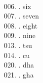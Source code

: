 \begin{tabbing}
\filler\tenrm\ \tibetan
\egroup  \\
006. .	\> six	\> \bgroup\tibetan \def\u#1{\vtop{\baselineskip0pt\hbox{#1}\hbox{\tibsp\char123}}}\parindent=0pt \newbox\fillerbox\setbox\fillerbox\hbox{\vrule height0.4cm depth0.4cm width0pt}\def\filler{\copy\fillerbox}\tibsp{}\tibetan%
\filler\tenrm\ \tibetan
\egroup  \\
007. .	\> seven	\> \bgroup\tibetan \def\u#1{\vtop{\baselineskip0pt\hbox{#1}\hbox{\tibsp\char123}}}\parindent=0pt \newbox\fillerbox\setbox\fillerbox\hbox{\vrule height0.4cm depth0.4cm width0pt}\def\filler{\copy\fillerbox}\tibsp{}\tibetan%
\filler\tenrm\ \tibetan
\egroup  \\
008. .	\> eight	\> \bgroup\tibetan \def\u#1{\vtop{\baselineskip0pt\hbox{#1}\hbox{\tibsp\char123}}}\parindent=0pt \newbox\fillerbox\setbox\fillerbox\hbox{\vrule height0.4cm depth0.4cm width0pt}\def\filler{\copy\fillerbox}\tibsp{}\tibetan%
\filler\tenrm\ \tibetan
\egroup  \\
009. .	\> nine	\> \bgroup\tibetan \def\u#1{\vtop{\baselineskip0pt\hbox{#1}\hbox{\tibsp\char123}}}\parindent=0pt \newbox\fillerbox\setbox\fillerbox\hbox{\vrule height0.4cm depth0.4cm width0pt}\def\filler{\copy\fillerbox}\tibsp{}\tibetan%
\filler\tenrm\ \tibetan
\egroup  \\
013. .	\> tsu	\> \bgroup\tibetan \def\u#1{\vtop{\baselineskip0pt\hbox{#1}\hbox{\tibsp\char123}}}\parindent=0pt \newbox\fillerbox\setbox\fillerbox\hbox{\vrule height0.4cm depth0.4cm width0pt}\def\filler{\copy\fillerbox}\tibsp{}\tibetan%
\filler\tibsp{}\tenrm\ \tibetan
\egroup  \\
014. .	\> cu	\> \bgroup\tibetan \def\u#1{\vtop{\baselineskip0pt\hbox{#1}\hbox{\tibsp\char123}}}\parindent=0pt \newbox\fillerbox\setbox\fillerbox\hbox{\vrule height0.4cm depth0.4cm width0pt}\def\filler{\copy\fillerbox}\tibsp{}\tibetan%
\filler\tibsp{}\tenrm\ \tibetan
\egroup  \\
020. .	\> dha	\> \bgroup\tibetan \def\u#1{\vtop{\baselineskip0pt\hbox{#1}\hbox{\tibsp\char123}}}\parindent=0pt \newbox\fillerbox\setbox\fillerbox\hbox{\vrule height0.4cm depth0.4cm width0pt}\def\filler{\copy\fillerbox}\tibsp{}\tibetan%
\filler\tibsp{}\tenrm\ \tibetan
\egroup  \\
021. .	\> gha	\> \bgroup\tibetan \def\u#1{\vtop{\baselineskip0pt\hbox{#1}\hbox{\tibsp\char123}}}\parindent=0pt \newbox\fillerbox\setbox\fillerbox\hbox{\vrule height0.4cm depth0.4cm width0pt}\def\filler{\copy\fillerbox}\tibsp{}\tibetan%

\end{tabbing}
